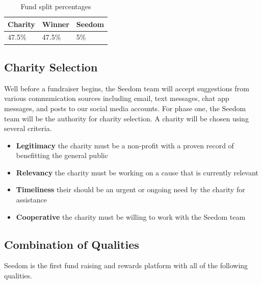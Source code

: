 \documentclass[11pt]{article}
\begin{document}
\begin{table}[H]
\begin{center}
\begin{tabular}{| l | l | l |}
\hline
\textbf{Charity} & \textbf{Winner} & \textbf{Seedom} \\ \hline
47.5\% & 47.5\%  & 5\% \\ \hline
\end{tabular}
\caption{Fund split percentages}
\label{tab:fundSplitPercentages}
\end{center}
\end{table}

\subsection{Charity Selection}

Well before a fundraiser begins, the Seedom team will accept suggestions from various communication sources including email, text messages, chat app messages, and posts to our social media accounts. For phase one, the Seedom team will be the authority for charity selection. A charity will be chosen using several criteria.

\begin{itemize}
\item{\textbf{Legitimacy} the charity must be a non-profit with a proven record of benefitting the general public}
\item{\textbf{Relevancy} the charity must be working on a cause that is currently relevant}
\item{\textbf{Timeliness} their should be an urgent or ongoing need by the charity for assistance}
\item{\textbf{Cooperative} the charity must be willing to work with the Seedom team}
\end{itemize}

\subsection{Combination of Qualities}

Seedom is the first fund raising and rewards platform with all of the following qualities.
\end{document}
